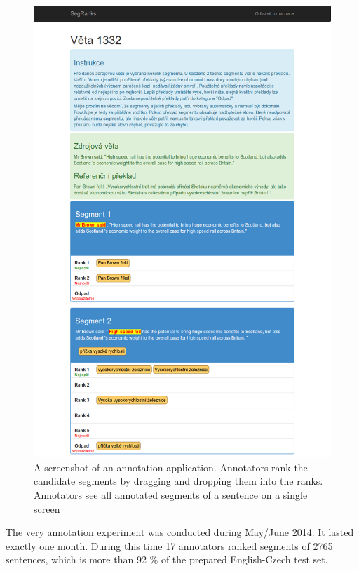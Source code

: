 \begin{figure}
    \begin{center}
        \includegraphics[width=\textwidth]{img/segranks-screenshot2.png}
    \end{center}
    \caption{A screenshot of an annotation application. Annotators rank the
    candidate segments by dragging and dropping them into the ranks.
Annotators see all annotated segments of a sentence on a single screen}
    \label{segranks-screenshot}
\end{figure}

The very annotation experiment was conducted during May/June 2014. It lasted
exactly one month. During this time 17 annotators ranked segments of 2765
sentences, which is more than 92 \% of the prepared English-Czech test set.

